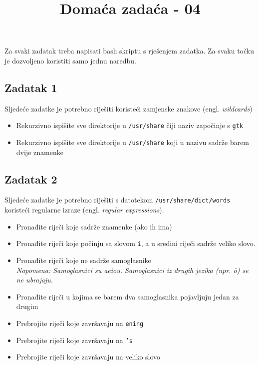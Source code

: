 \documentclass[12pt,a4paper]{article}
\newcommand{\shell}[1]{\texttt{#1}}
\begin{document}
	\title{Domaća zadaća - 04\vspace{-2em}}
	\maketitle
	Za svaki zadatak treba napisati bash skriptu s rješenjem zadatka. Za svaku točku je dozvoljeno koristiti samo jednu naredbu.

	\subsection*{Zadatak 1}
	Sljedeće zadatke je potrebno riješiti koristeći zamjenske znakove (engl. \emph{wildcards})
	\begin{itemize}
		\item Rekurzivno ispišite sve direktorije u \shell{/usr/share} čiji naziv započinje s \shell{gtk}
		\item Rekurzivno ispišite sve direktorije u \shell{/usr/share} koji u nazivu sadrže barem dvije znamenke
	\end{itemize}

	\subsection*{Zadatak 2}
	Sljedeće zadatke je potrebno riješiti s datotekom \shell{/usr/share/dict/words} koristeći regularne izraze (engl. \emph{regular expressions}).
	\begin{itemize}
		\item Pronađite riječi koje sadrže znamenke (ako ih ima)
		\item Pronađite riječi koje počinju sa slovom \shell{i}, a u sredini riječi sadrže veliko slovo.
		\item Pronađite riječi koje ne sadrže samoglasnike \\ \emph{Napomena: Samoglasnici su aeiou. Samoglasnici iz drugih jezika (npr. ö) se ne ubrajaju.}
		\item Pronađite riječi u kojima se barem dva samoglasnika pojavljuju jedan za drugim
		\item Prebrojite riječi koje završavaju na \shell{ening}
		\item Prebrojite riječi koje završavaju na \shell{'s}
		\item Prebrojite riječi koje završavaju na veliko slovo
	\end{itemize}
\end{document}
